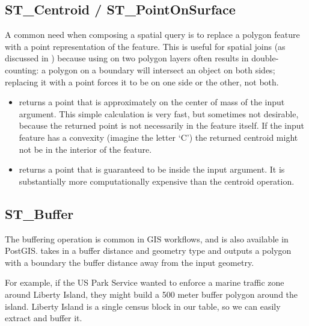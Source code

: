 \documentclass[a4paper,11pt,english]{sphinxmanual}
\begin{document}
\subsection{ST\_Centroid / ST\_PointOnSurface}
\label{\detokenize{basic:st-centroid-st-pointonsurface}}
A common need when composing a spatial query is to replace a polygon feature with a point representation of the feature. This is useful for spatial joins (as discussed in ) because using  on two polygon layers often results in double-counting: a polygon on a boundary will intersect an object on both sides; replacing it with a point forces it to be on one side or the other, not both.
\begin{itemize}
\item {} 
 returns a point that is approximately on the center of mass of the input argument. This simple calculation is very fast, but sometimes not desirable, because the returned point is not necessarily in the feature itself. If the input feature has a convexity (imagine the letter ‘C’) the returned centroid might not be in the interior of the feature.

\item {} 
 returns a point that is guaranteed to be inside the input argument. It is substantially more computationally expensive than the centroid operation.

\end{itemize}

\noindent{}


\subsection{ST\_Buffer}
\label{\detokenize{basic:st-buffer}}
The buffering operation is common in GIS workflows, and is also available in PostGIS.  takes in a buffer distance and geometry type and outputs a polygon with a boundary the buffer distance away from the input geometry.

\noindent{}

For example, if the US Park Service wanted to enforce a marine traffic zone around Liberty Island, they might build a 500 meter buffer polygon around the island. Liberty Island is a single census block in our  table, so we can easily extract and buffer it.
\end{document}

